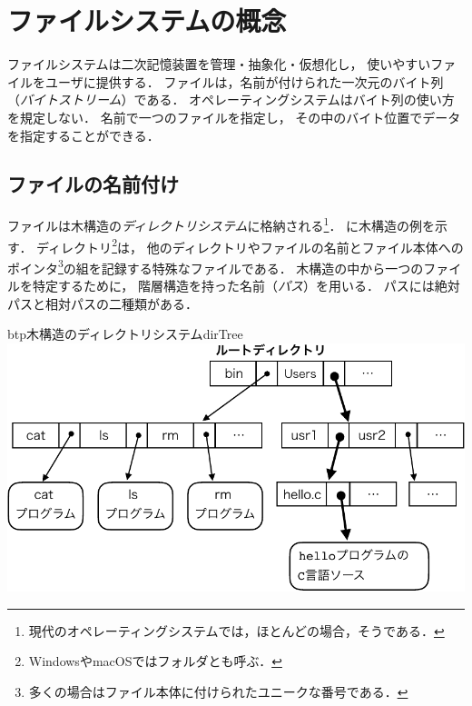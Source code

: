 \chapter{ファイルシステムの概念}
\label{fileSystemConcepts}
ファイルシステムは二次記憶装置を管理・抽象化・仮想化し，
使いやすいファイルをユーザに提供する．
ファイルは，名前が付けられた一次元のバイト列（\emph{バイトストリーム}）である．
オペレーティングシステムはバイト列の使い方を規定しない．
名前で一つのファイルを指定し，
その中のバイト位置でデータを指定することができる．


\section{ファイルの名前付け}
ファイルは木構造の\emph{ディレクトリシステム}に格納される\footnote{
  現代のオペレーティングシステムでは，ほとんどの場合，そうである．}．
に木構造の例を示す．
ディレクトリ\footnote{WindowsやmacOSではフォルダとも呼ぶ．}は，
他のディレクトリやファイルの名前とファイル本体へのポインタ\footnote{
  多くの場合はファイル本体に付けられたユニークな番号である．
}の組を記録する特殊なファイルである．
木構造の中から一つのファイルを特定するために，
階層構造を持った名前（\emph{パス}）を用いる．
パスには絶対パスと相対パスの二種類がある．

\begin{myfig}{btp}{木構造のディレクトリシステム}{dirTree}
  \includegraphics[scale=.8]{Fig/dirTree-crop.pdf}
\end{myfig}

